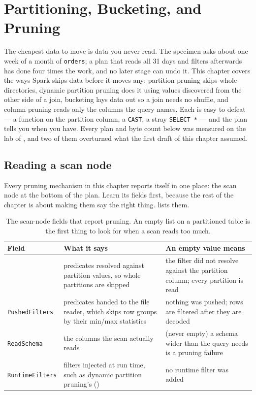 \chapter{Partitioning, Bucketing, and Pruning}
\label{ch:pruning}

\begin{chapterintro}
The cheapest data to move is data you never read. The specimen asks about one
week of a month of \texttt{orders}; a plan that reads all 31 days and filters
afterwards has done four times the work, and no later stage can undo it. This
chapter covers the ways Spark skips data before it moves any: partition pruning
skips whole directories, dynamic partition pruning does it using values
discovered from the other side of a join, bucketing lays data out so a join
needs no shuffle, and column pruning reads only the columns the query names.
Each is easy to defeat --- a function on the partition column, a \texttt{CAST},
a stray \texttt{SELECT *} --- and the plan tells you when you have. Every plan
and byte count below was measured on the lab of , and two of
them overturned what the first draft of this chapter assumed.
\end{chapterintro}

\section{Reading a scan node}
\label{sec:pruning-scan}

Every pruning mechanism in this chapter reports itself in one place: the scan
node at the bottom of the plan. Learn its fields first, because the rest of the
chapter is about making them say the right thing. 
lists them.

\begin{table}[htbp]
\centering\footnotesize
\renewcommand{\arraystretch}{1.25}
\begin{tabular}{@{}P{3.1cm}P{5.4cm}P{5.6cm}@{}}
\toprule
\textbf{Field} & \textbf{What it says} & \textbf{An empty value means} \\
\midrule
{} & predicates resolved against partition values, so whole partitions are skipped & the filter did not resolve against the partition column; every partition is read \\
\texttt{PushedFilters} & predicates handed to the file reader, which skips row groups by their min/max statistics & nothing was pushed; rows are filtered after they are decoded \\
\texttt{ReadSchema} & the columns the scan actually reads & (never empty) a schema wider than the query needs is a pruning failure \\
\texttt{RuntimeFilters} & filters injected at run time, such as dynamic partition pruning's () & no runtime filter was added \\
\bottomrule
\end{tabular}
\caption{The scan-node fields that report pruning. An empty list on a
partitioned table is the first thing to look for when a scan reads too much.}
\label{tab:pruning-scan-fields}
\end{table}

